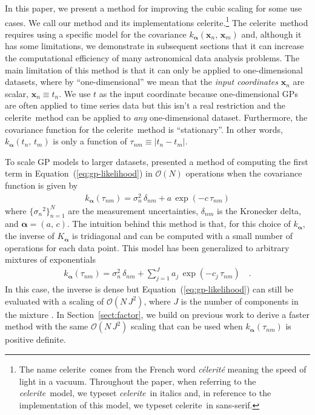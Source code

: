 \documentclass[manuscript, letterpaper]{aastex6}
\makeatletter
\let\origsection\section
\renewcommand\section{\@ifstar{\starsection}{\nostarsection}}
\newcommand\nostarsection[1]{\sectionprelude\origsection{#1}}
\newcommand\starsection[1]{\sectionprelude\origsection*{#1}}
\newcommand\sectionprelude{\vspace{1em}}
\newcommand{\project}[1]{\textsf{#1}}
\newcommand{\celerite}{\project{celerite}}
\newcommand{\celeriteterm}{\emph{celerite}}
\newcommand{\foreign}[1]{\emph{#1}}
\renewcommand{\eqref}[1]{\ref{eq:#1}}
\newcommand{\Eq}[1]{Equation~(\eqref{#1})}
\newcommand{\eq}[1]{\Eq{#1}}
\newcommand{\eqlabel}[1]{\label{eq:#1}}
\newcommand{\sectionname}{Section}
\newcommand{\sectref}[1]{\ref{sect:#1}}
\newcommand{\Sect}[1]{\sectionname~\sectref{#1}}
\newcommand{\sect}[1]{\Sect{#1}}
\newcommand{\sectlabel}[1]{\label{sect:#1}}
\newcommand{\bvec}[1]{{\ensuremath{\boldsymbol{#1}}}}
\newcommand{\response}[1]{{#1}}
\makeatother
\begin{document}
In this paper, we present a method for improving the cubic scaling for some
use cases.
We call our method and its implementations \celerite.\footnote{The name
    \celerite\ comes from the French word \foreign{c\'elerit\'e} meaning the speed
    of light in a vacuum.
    \response{Throughout the paper, when referring to the \celeriteterm\ model, we
        typeset \celeriteterm\ in italics and, in reference to the implementation of
        this model, we typeset \celerite\ in sans-serif.}}
The \celerite\ method requires using a specific model
for the covariance $k_\bvec{\alpha}(\bvec{x}_n,\,\bvec{x}_m)$ and, although it
has some limitations, we demonstrate in subsequent sections that it can
increase the computational efficiency of many astronomical data analysis
problems.
The main limitation of this method is that it can only be applied to
one-dimensional datasets, where by ``one-dimensional'' we mean that the
\emph{input coordinates} $\bvec{x}_n$ are scalar, $\bvec{x}_n \equiv
    t_n$.
We use $t$ as the input coordinate because one-dimensional GPs are often
applied to time series data but this isn't a real restriction and the
\celerite\ method can be applied to \emph{any} one-dimensional dataset.
Furthermore, the covariance function for the \celerite\ method is
``stationary''.
In other words, $k_\bvec{\alpha}(t_n,\,t_m)$ is only a function of $\tau_{nm}
    \equiv |t_n - t_m|$.

\section{The celerite model}\sectlabel{celerite}

To scale GP models to larger datasets, \citet{Rybicki:1995} presented a method
of computing the first term in \eq{gp-likelihood} in $\mathcal{O}(N)$
operations when the covariance function is given by
\begin{eqnarray}\eqlabel{kernel-simple}
    k_\bvec{\alpha}(\tau_{nm}) = \sigma_n^2\,\delta_{nm} + a\,\exp(-c\,\tau_{nm})
\end{eqnarray}
where $\{{\sigma_n}^2\}_{n=1}^N$ are the measurement uncertainties,
$\delta_{nm}$ is the Kronecker delta, and $\bvec{\alpha} = (a,\,c)$.
The intuition behind this method is that, for this choice of $k_\bvec{\alpha}$,
the inverse of $K_\bvec{\alpha}$ is tridiagonal and can be computed
with a small number of operations for each data point.
\response{This model has been generalized to arbitrary mixtures of
    exponentials \citep[for example,][]{Kelly:2011}
    \begin{eqnarray}
        k_\bvec{\alpha}(\tau_{nm}) = \sigma_n^2\,\delta_{nm} +
        \sum_{j=1}^J a_j\,\exp(-c_j\,\tau_{nm}) \quad.
    \end{eqnarray}
    In this case, the inverse is dense but \eq{gp-likelihood} can still be
    evaluated with a scaling of $\mathcal{O}(N\,J^2)$, where $J$ is the number of
    components in the mixture \citep{Kelly:2014,Ambikasaran:2015}.
    In \sect{factor}, we build on previous work \citep{Ambikasaran:2015} to derive
    a faster method with the same $\mathcal{O}(N\,J^2)$ scaling that can be used
    when $k_\bvec{\alpha}(\tau_{nm})$ is positive definite.}
\end{document}
